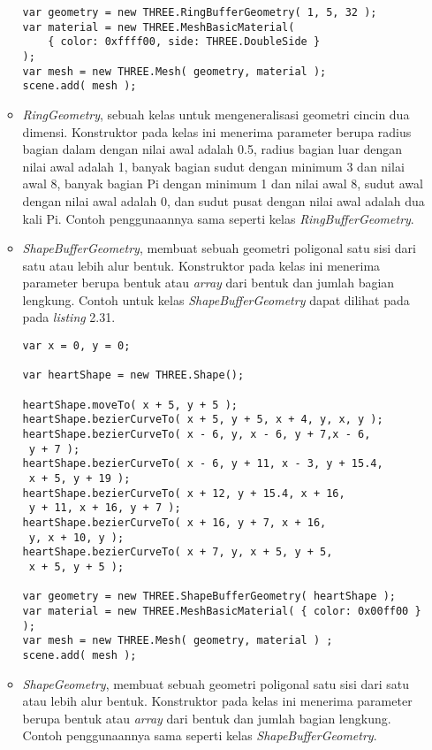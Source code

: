 \begin{itemize}
\begin{itemize}
\begin{lstlisting}[caption={Contoh penggunaan kelas {\it RingBufferGeometry}.},captionpos=b]
var geometry = new THREE.RingBufferGeometry( 1, 5, 32 );
var material = new THREE.MeshBasicMaterial( 
	{ color: 0xffff00, side: THREE.DoubleSide } 
);
var mesh = new THREE.Mesh( geometry, material );
scene.add( mesh );
\end{lstlisting}

	\item {\it RingGeometry}, sebuah kelas untuk mengeneralisasi geometri cincin dua dimensi. Konstruktor pada kelas ini menerima parameter berupa radius bagian dalam dengan nilai awal adalah 0.5, radius bagian luar dengan nilai awal adalah 1, banyak bagian sudut dengan minimum 3 dan nilai awal 8, banyak bagian Pi dengan minimum 1 dan nilai awal 8, sudut awal dengan nilai awal adalah 0, dan sudut pusat dengan nilai awal adalah dua kali Pi.  Contoh penggunaannya sama seperti kelas {\it RingBufferGeometry}.
	
	\item {\it ShapeBufferGeometry}, membuat sebuah geometri poligonal satu sisi dari satu atau lebih alur bentuk. Konstruktor pada kelas ini menerima parameter berupa bentuk atau {\it array} dari bentuk dan jumlah bagian lengkung. Contoh untuk kelas {\it ShapeBufferGeometry} dapat dilihat pada pada {\it listing} 2.31.
	
\begin{lstlisting}[caption={Contoh penggunaan kelas {\it ShapeBufferGeometry}.},captionpos=b]
var x = 0, y = 0;

var heartShape = new THREE.Shape();

heartShape.moveTo( x + 5, y + 5 );
heartShape.bezierCurveTo( x + 5, y + 5, x + 4, y, x, y );
heartShape.bezierCurveTo( x - 6, y, x - 6, y + 7,x - 6,
 y + 7 );
heartShape.bezierCurveTo( x - 6, y + 11, x - 3, y + 15.4,
 x + 5, y + 19 );
heartShape.bezierCurveTo( x + 12, y + 15.4, x + 16,
 y + 11, x + 16, y + 7 );
heartShape.bezierCurveTo( x + 16, y + 7, x + 16,
 y, x + 10, y );
heartShape.bezierCurveTo( x + 7, y, x + 5, y + 5,
 x + 5, y + 5 );

var geometry = new THREE.ShapeBufferGeometry( heartShape );
var material = new THREE.MeshBasicMaterial( { color: 0x00ff00 } );
var mesh = new THREE.Mesh( geometry, material ) ;
scene.add( mesh );
\end{lstlisting}

	\item {\it ShapeGeometry}, membuat sebuah geometri poligonal satu sisi dari satu atau lebih alur bentuk. Konstruktor pada kelas ini menerima parameter berupa bentuk atau {\it array} dari bentuk dan jumlah bagian lengkung. Contoh penggunaannya sama seperti kelas {\it ShapeBufferGeometry}.


\end{itemize}
\end{itemize}
